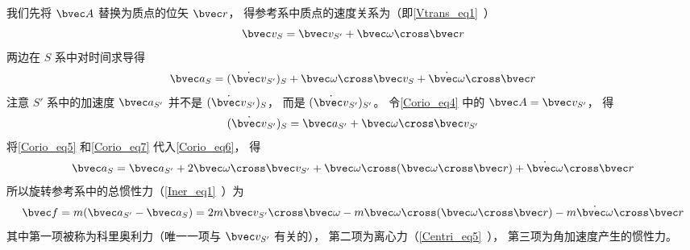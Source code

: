 我们先将 $\bvec A$ 替换为质点的位矢 $\bvec r$， 得参考系中质点的速度关系为（即\autoref{Vtrans_eq1}~）
\begin{equation}\label{Corio_eq5}
\bvec v_{S} = \bvec v_{S'} + \bvec\omega\cross\bvec r
\end{equation}
两边在 $S$ 系中对时间求导得
\begin{equation}\label{Corio_eq6}
\bvec a_{S} = (\dot{\bvec v}_{S'})_{S} + \bvec\omega\cross\bvec v_{S} + \dot{\bvec\omega} \cross\bvec r
\end{equation}
注意 $S'$ 系中的加速度 $\bvec a_{S'}$ 并不是 $(\dot{\bvec v}_{S'})_{S}$， 而是 $(\dot{\bvec v}_{S'})_{S'}$。 令\autoref{Corio_eq4} 中的 $\bvec A = \bvec v_{S'}$， 得
\begin{equation}\label{Corio_eq7}
(\dot{\bvec v}_{S'})_{S} = \bvec a_{S'} + \bvec\omega\cross\bvec v_{S'}
\end{equation}
将\autoref{Corio_eq5} 和\autoref{Corio_eq7} 代入\autoref{Corio_eq6}， 得
\begin{equation}
\bvec a_{S} = \bvec a_{S'} + 2\bvec\omega\cross\bvec v_{S'} + \bvec\omega\cross(\bvec\omega\cross\bvec r) + \dot{\bvec\omega} \cross\bvec r
\end{equation}
所以旋转参考系中的总惯性力（\autoref{Iner_eq1}~）为
\begin{equation}\label{Corio_eq1}
\bvec f = m(\bvec a_{S'} - \bvec a_{S}) = 2m\bvec v_{S'}\cross \bvec\omega  -m\bvec\omega\cross(\bvec\omega\cross\bvec r) - m \dot{\bvec\omega} \cross\bvec r
\end{equation}
其中第一项被称为科里奥利力（唯一一项与 $\bvec v_{S'}$ 有关的）， 第二项为离心力（\autoref{Centri_eq5}~）， 第三项为角加速度产生的惯性力。
